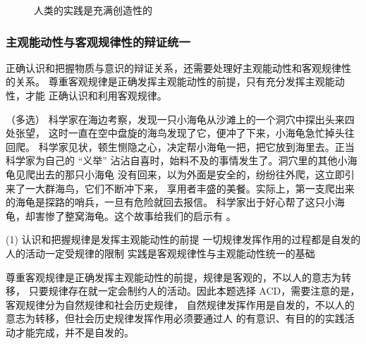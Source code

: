 \documentclass[10pt, UTF8]{book} %
\begin{document}
\begin{example}
\begin{cmt}
\begin{figure}[H]
\begin{tikzpicture}[x=0.75pt,y=0.75pt,yscale=-1,xscale=1]
\end{tikzpicture}
\caption{人类的实践是充满创造性的}
        \end{figure}
    \end{cmt}
\end{example}



\subsubsection{主观能动性与客观规律性的辩证统一}

正确认识和把握物质与意识的辩证关系，还需要处理好主观能动性和客观规律性
的关系。
尊重客观规律是正确发挥主观能动性的前提，只有充分发挥主观能动性，才能
正确认识和利用客观规律。

\begin{example}
    （多选）
    科学家在海边考察，发现一只小海龟从沙滩上的一个洞穴中探出头来四处张望，
    这时一直在空中盘旋的海鸟发现了它，便冲了下来，小海龟急忙掉头往回爬。
    科学家见状，顿生恻隐之心，决定帮小海龟一把，把它放到海里去。正当科学家为自己的
    “义举” 沾沾自喜时，始料不及的事情发生了。洞穴里的其他小海龟见爬出去的那只小海龟
    没有回来，以为外面是安全的，纷纷往外爬，这立即引来了一大群海鸟，它们不断冲下来，
    享用者丰盛的美餐。实际上，第一支爬出来的海龟是探路的哨兵，一旦有危险就回去报信。
    科学家出于好心帮了这只小海龟，却害惨了整窝海龟。这个故事给我们的启示有 \underline{\qquad \qquad \qquad}。
    \begin{tasks}[label={\Alph*.}](1)
        \task 认识和把握规律是发挥主观能动性的前提
        \task 一切规律发挥作用的过程都是自发的
        \task 人的活动一定受规律的限制
        \task 实践是客观规律性与主观能动性统一的基础
    \end{tasks}
    \begin{cmt}
        尊重客观规律是正确发挥主观能动性的前提，规律是客观的，不以人的意志为转移，
        只要规律存在就一定会制约人的活动。因此本题选择 ACD，需要注意的是，
        客观规律分为自然规律和社会历史规律，
        自然规律发挥作用是自发的，不以人的意志为转移，但社会历史规律发挥作用必须要通过人
        的有意识、有目的的实践活动才能完成，并不是自发的。
    \end{cmt}
\end{example}
\end{document}
